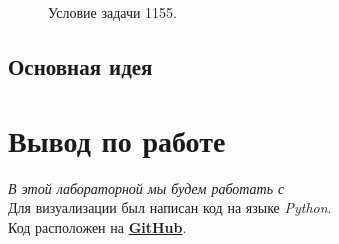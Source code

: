 \documentclass[a5paper, 10pt]{article}
\theoremstyle{definition}
\theoremstyle{plain}
\theoremstyle{remark}
\begin{document}
\begin{figure}[h]
\caption{Условие задачи 1155.}
\end{figure}

\subsection{Основная идея}

\newpage
\section{Вывод по работе}

\textit{В этой лабораторной мы будем работать с }
\\
Для визуализации был написан код на языке \textit{Python}. \\
Код расположен на \href{https://github.com/a-nechaeva/practical_Linal/tree/main/lab4}{\textbf{GitHub}}.
\end{document}
